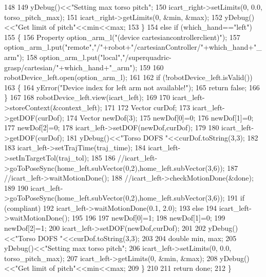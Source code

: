 \begin{DoxyCode}
148 
149         yDebug()<<\textcolor{stringliteral}{"Setting max torso pitch"};
150         icart\_right->setLimits(0, 0.0, torso_pitch_max);     
151         icart\_right->getLimits(0, &min, &max);
152         yDebug()<<\textcolor{stringliteral}{"Get limit of pitch"}<<min<<max;
153     \}
154     \textcolor{keywordflow}{else} \textcolor{keywordflow}{if} (which\_hand==\textcolor{stringliteral}{"left"})
155     \{
156         Property option\_arm\_l(\textcolor{stringliteral}{"(device cartesiancontrollerclient)"});
157         option\_arm\_l.put(\textcolor{stringliteral}{"remote"},\textcolor{stringliteral}{"/"}+robot+\textcolor{stringliteral}{"/cartesianController/"}+which\_hand+\textcolor{stringliteral}{"\_arm"});
158         option\_arm\_l.put(\textcolor{stringliteral}{"local"},\textcolor{stringliteral}{"/superquadric-grasp/cartesian/"}+which\_hand+\textcolor{stringliteral}{"\_arm"});
159 
160         robotDevice\_left.open(option\_arm\_l);
161 
162         \textcolor{keywordflow}{if} (!robotDevice\_left.isValid())
163         \{
164             yError(\textcolor{stringliteral}{"Device index for left arm not available!"});
165             \textcolor{keywordflow}{return} \textcolor{keyword}{false};
166         \}
167 
168         robotDevice\_left.view(icart\_left);
169 
170         icart\_left->storeContext(&context_left);
171 
172         Vector curDof;
173         icart\_left->getDOF(curDof);
174         Vector newDof(3);
175         newDof[0]=0;
176         newDof[1]=0;
177         newDof[2]=0;
178         icart\_left->setDOF(newDof,curDof);
179 
180         icart\_left->getDOF(curDof);
181         yDebug()<<\textcolor{stringliteral}{"Torso DOFS "}<<curDof.toString(3,3);
182 
183         icart\_left->setTrajTime(traj_time);
184         icart\_left->setInTargetTol(traj_tol);
185 
186         \textcolor{comment}{//icart\_left->goToPoseSync(home\_left.subVector(0,2),home\_left.subVector(3,6));}
187         \textcolor{comment}{//icart\_left->waitMotionDone();}
188         \textcolor{comment}{//icart\_left->checkMotionDone(&done);}
189 
190         icart\_left->goToPoseSync(home_left.subVector(0,2),home_left.subVector(3,6));
191         \textcolor{keywordflow}{if} (compliant)
192             icart\_left->waitMotionDone(0.1, 2.0);
193         \textcolor{keywordflow}{else}
194             icart\_left->waitMotionDone();
195 
196 
197         newDof[0]=1;
198         newDof[1]=0;
199         newDof[2]=1;
200         icart\_left->setDOF(newDof,curDof);
201 
202         yDebug()<<\textcolor{stringliteral}{"Torso DOFS "}<<curDof.toString(3,3);
203 
204         \textcolor{keywordtype}{double} min, max;
205         yDebug()<<\textcolor{stringliteral}{"Setting max torso pitch"};
206         icart\_left->setLimits(0, 0.0, torso_pitch_max);
207         icart\_left->getLimits(0, &min, &max);
208         yDebug()<<\textcolor{stringliteral}{"Get limit of pitch"}<<min<<max;     
209     \}
210 
211     \textcolor{keywordflow}{return} done;
212 \}
\end{DoxyCode}
